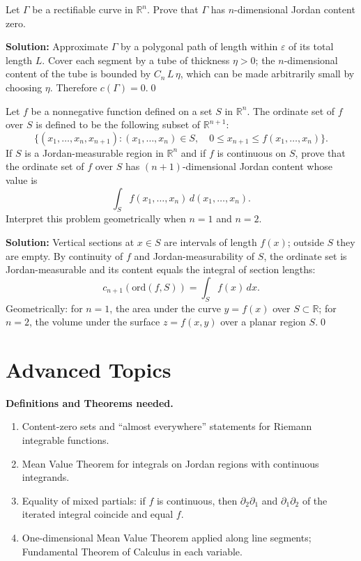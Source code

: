 \begin{problembox}
Let \( \Gamma \) be a rectifiable curve in \( \mathbb{R}^n \). Prove that \( \Gamma \) has \( n \)-dimensional Jordan content zero.
\end{problembox}

\noindent\textbf{Solution:}
Approximate $\Gamma$ by a polygonal path of length within $\varepsilon$ of its total length $L$. Cover each segment by a tube of thickness $\eta>0$; the $n$-dimensional content of the tube is bounded by $C_n\,L\,\eta$, which can be made arbitrarily small by choosing $\eta$. Therefore $c(\Gamma)=0$.\qed


\begin{problembox}
Let \( f \) be a nonnegative function defined on a set \( S \) in \( \mathbb{R}^n \). The ordinate set of \( f \) over \( S \) is defined to be the following subset of \( \mathbb{R}^{n+1} \):
\[\{(x_1, \ldots, x_n, x_{n+1}) : (x_1, \ldots, x_n) \in S, \quad 0 \leq x_{n+1} \leq f(x_1, \ldots, x_n)\}.\]
If \( S \) is a Jordan-measurable region in \( \mathbb{R}^n \) and if \( f \) is continuous on \( S \), prove that the ordinate set of \( f \) over \( S \) has \( (n + 1) \)-dimensional Jordan content whose value is
\[\int_{S} f(x_1, \ldots, x_n) \, d(x_1, \ldots, x_n).\]
Interpret this problem geometrically when \( n = 1 \) and \( n = 2 \).
\end{problembox}

\noindent\textbf{Solution:}
Vertical sections at $x\in S$ are intervals of length $f(x)$; outside $S$ they are empty. By continuity of $f$ and Jordan-measurability of $S$, the ordinate set is Jordan-measurable and its content equals the integral of section lengths:
\[ c_{n+1}(\text{ord}(f,S)) = \int_S f(x)\,dx. \]
Geometrically: for $n=1$, the area under the curve $y=f(x)$ over $S\subset\mathbb R$; for $n=2$, the volume under the surface $z=f(x,y)$ over a planar region $S$.\qed
\section{Advanced Topics}
\noindent\textbf{Definitions and Theorems needed.}
\begin{enumerate}[label=(\roman*)]
    \item Content-zero sets and ``almost everywhere'' statements for Riemann integrable functions.
    \item Mean Value Theorem for integrals on Jordan regions with continuous integrands.
    \item Equality of mixed partials: if $f$ is continuous, then $\partial_2\partial_1$ and $\partial_1\partial_2$ of the iterated integral coincide and equal $f$.
    \item One-dimensional Mean Value Theorem applied along line segments; Fundamental Theorem of Calculus in each variable.
\end{enumerate}



